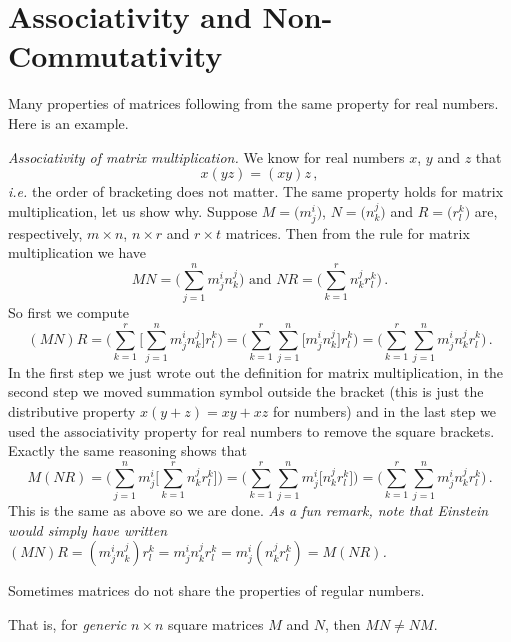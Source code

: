 \section{Associativity and Non-Commutativity }

Many properties of matrices following from the same property for real numbers. Here is an example.

\begin{example}
{\itshape Associativity of matrix multiplication.} We know for real numbers $x$, $y$ and $z$ that 
\[
x(yz)=(xy)z\, ,
\]
{\itshape i.e.} the order of bracketing does not matter. The same property holds for matrix multiplication, let us show why.
Suppose $M=\big( m^i_j \big)$, $N=\big( n^j_k \big)$ and  $R=\big( r^k_l \big)$ are, 
respectively, $m\times n$, $n\times r$ and $r\times t$ matrices. Then from the rule for matrix
multiplication we have
\[
MN=\Big(\sum_{j=1}^n m^i_j n^j_k\Big)\mbox{ and } NR=\Big(\sum_{k=1}^r n^j_k r^k_l\Big)\, .
\]
So first we compute 
\[
(MN)R=\Big(\sum_{k=1}^r \Big[\sum_{j=1}^n m^i_j n^j_k\Big] r^k_l \Big) = 
\Big(\sum_{k=1}^r \sum_{j=1}^n \Big[ m^i_j n^j_k\Big] r^k_l \Big) =\Big(\sum_{k=1}^r \sum_{j=1}^n m^i_j n^j_k r^k_l \Big)\, .
\]
In the first step we just wrote out the definition for matrix multiplication, in the second step we
moved summation symbol outside the bracket (this is just the distributive
property $x(y+z)=xy+xz$ for numbers) and
in the last step we used the associativity property for real numbers to remove the square brackets. 
Exactly the same reasoning shows that
\[
M(NR)=\Big(\sum_{j=1}^n m^i_j\Big[\sum_{k=1}^r n^j_k r^k_l\Big]\Big) = 
\Big(\sum_{k=1}^r \sum_{j=1}^n  m^i_j \Big[n^j_kr^k_l \Big] \Big) =\Big(\sum_{k=1}^r \sum_{j=1}^n m^i_j n^j_k r^k_l \Big)\, .
\]
This is the same as above so we are done. {\itshape As a fun remark, note that Einstein would simply have written
$(MN)R=(m^i_j n^j_k) r^k_l= m^i_j n^j_k r^k_l = m^i_j (n^j_k r^k_l ) = M(NR)$.}
\end{example}


Sometimes matrices do not share the properties of regular numbers. 


That is, for {\itshape generic} $n\times n$ square matrices $M$ and $N$, then $MN\neq NM$. 

